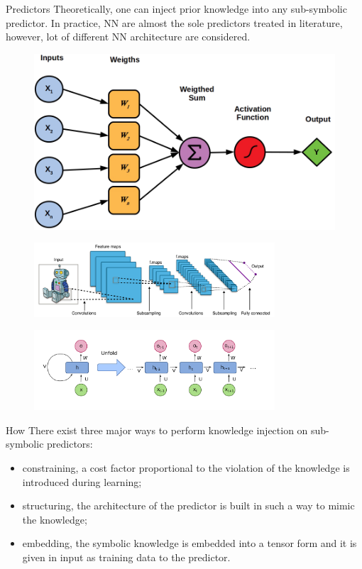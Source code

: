 \documentclass[presentation]{beamer}\mode<presentation>{\usetheme{AMSBolognaFC}}
\begin{document}
\begin{frame}[allowframebreaks]{Predictors}
    Theoretically, one can inject prior knowledge into any sub-symbolic predictor.
    In practice, NN are almost the sole predictors treated in literature, however, lot of different NN architecture are considered.
    \begin{figure}
        \centering
        \includegraphics[width=.6\linewidth]{figures/neuron.png}
    \end{figure}
    
    \framebreak
    
    \begin{figure}
        \centering
        \includegraphics[width=0.8\textwidth]{figures/cnn-architecture}
    \end{figure}
    \begin{figure}
        \centering
        \includegraphics[width=0.8\textwidth]{figures/rnn-architecture}
    \end{figure}
\end{frame}


\begin{frame}[c]{How}
    There exist three major ways to perform knowledge injection on sub-symbolic predictors:
    \begin{itemize}
        \item \alert{constraining}, a cost factor proportional to the violation of the knowledge is introduced during learning;
        \item \alert{structuring}, the architecture of the predictor is built in such a way to mimic the knowledge;
        \item \alert{embedding}, the symbolic knowledge is embedded into a tensor form and it is given in input as training data to the predictor.
   \end{itemize} 
\end{frame}
\end{document}

